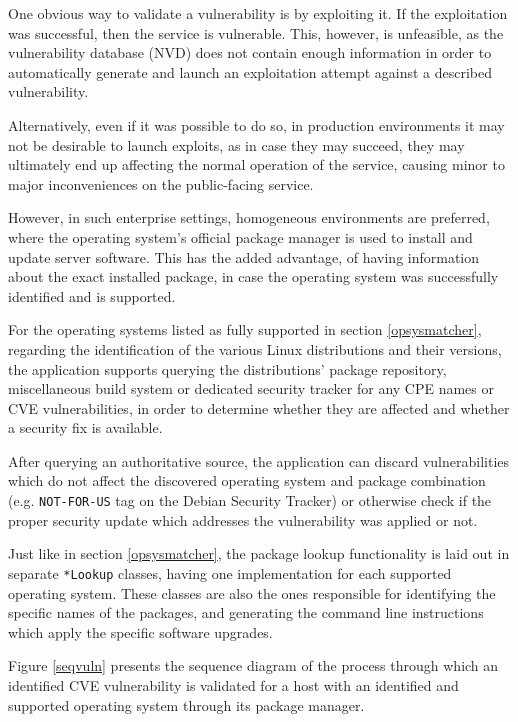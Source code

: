 \documentclass[a4paper,12pt]{article}
\begin{document}
	One obvious way to validate a vulnerability is by exploiting it. If the exploitation was successful, then the service is vulnerable. This, however, is unfeasible, as the vulnerability database (NVD) does not contain enough information in order to automatically generate and launch an exploitation attempt against a described vulnerability.
	
	Alternatively, even if it was possible to do so, in production environments it may not be desirable to launch exploits, as in case they may succeed, they may ultimately end up affecting the normal operation of the service, causing minor to major inconveniences on the public-facing service.
	
	However, in such enterprise settings, homogeneous environments are preferred, where the operating system's official package manager is used to install and update server software. This has the added advantage, of having information about the exact installed package, in case the operating system was successfully identified and is supported.
	
	For the operating systems listed as fully supported in section \ref{opsysmatcher}, regarding the identification of the various Linux distributions and their versions, the application supports querying the distributions' package repository, miscellaneous build system or dedicated security tracker for any CPE names or CVE vulnerabilities, in order to determine whether they are affected and whether a security fix is available.
	
	After querying an authoritative source, the application can discard vulnerabilities which do not affect the discovered operating system and package combination (e.g. \texttt{NOT-FOR-US} tag on the Debian Security Tracker) or otherwise check if the proper security update which addresses the vulnerability was applied or not.
	
	Just like in section \ref{opsysmatcher}, the package lookup functionality is laid out in separate \texttt{*Lookup} classes, having one implementation for each supported operating system. These classes are also the ones responsible for identifying the specific names of the packages, and generating the command line instructions which apply the specific software upgrades.
	
	Figure \ref{seqvuln} presents the sequence diagram of the process through which an identified CVE vulnerability is validated for a host with an identified and supported operating system through its package manager.
	
\end{document}
